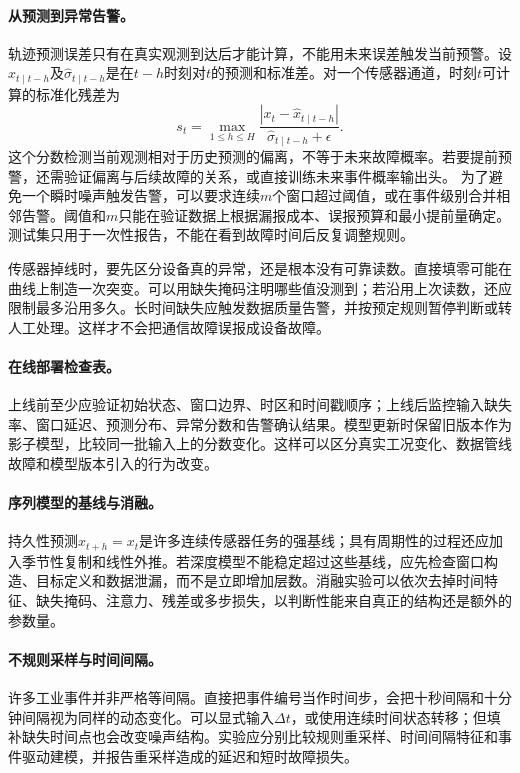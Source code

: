\paragraph{从预测到异常告警。}
轨迹预测误差只有在真实观测到达后才能计算，不能用未来误差触发当前预警。设$\hat x_{t\mid t-h}$及$\hat\sigma_{t\mid t-h}$是在$t-h$时刻对$t$的预测和标准差。对一个传感器通道，时刻$t$可计算的标准化残差为
\begin{equation}
 s_t=\max_{1\leq h\leq H}\frac{|x_t-\hat x_{t\mid t-h}|}{\hat\sigma_{t\mid t-h}+\epsilon}.
\end{equation}
这个分数检测当前观测相对于历史预测的偏离，不等于未来故障概率。若要提前预警，还需验证偏离与后续故障的关系，或直接训练未来事件概率输出头。
为了避免一个瞬时噪声触发告警，可以要求连续$m$个窗口超过阈值，或在事件级别合并相邻告警。阈值和$m$只能在验证数据上根据漏报成本、误报预算和最小提前量确定。测试集只用于一次性报告，不能在看到故障时间后反复调整规则。

传感器掉线时，要先区分设备真的异常，还是根本没有可靠读数。直接填零可能在曲线上制造一次突变。可以用缺失掩码注明哪些值没测到；若沿用上次读数，还应限制最多沿用多久。长时间缺失应触发数据质量告警，并按预定规则暂停判断或转人工处理。这样才不会把通信故障误报成设备故障。

\paragraph{在线部署检查表。}
上线前至少应验证初始状态、窗口边界、时区和时间戳顺序；上线后监控输入缺失率、窗口延迟、预测分布、异常分数和告警确认结果。模型更新时保留旧版本作为影子模型，比较同一批输入上的分数变化。这样可以区分真实工况变化、数据管线故障和模型版本引入的行为改变。

\paragraph{序列模型的基线与消融。}
持久性预测$\hat x_{t+h}=x_t$是许多连续传感器任务的强基线；具有周期性的过程还应加入季节性复制和线性外推。若深度模型不能稳定超过这些基线，应先检查窗口构造、目标定义和数据泄漏，而不是立即增加层数。消融实验可以依次去掉时间特征、缺失掩码、注意力、残差或多步损失，以判断性能来自真正的结构还是额外的参数量。

\paragraph{不规则采样与时间间隔。}
许多工业事件并非严格等间隔。直接把事件编号当作时间步，会把十秒间隔和十分钟间隔视为同样的动态变化。可以显式输入$\Delta t$，或使用连续时间状态转移；但填补缺失时间点也会改变噪声结构。实验应分别比较规则重采样、时间间隔特征和事件驱动建模，并报告重采样造成的延迟和短时故障损失。

